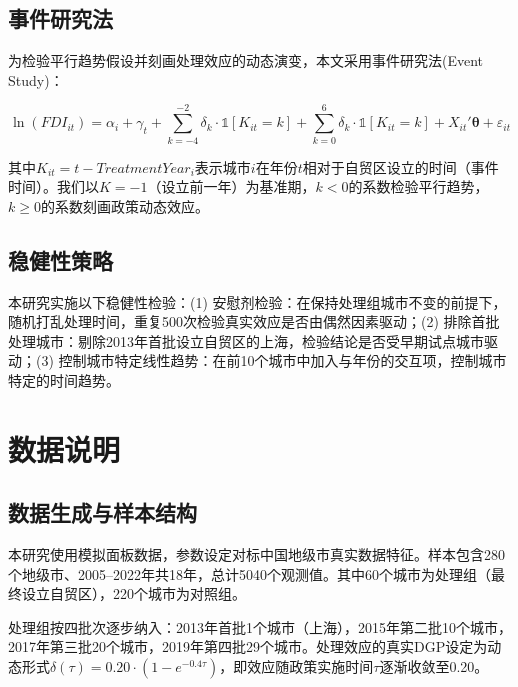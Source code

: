\documentclass[12pt,a4paper]{article}
\begin{document}
\subsection{事件研究法}

为检验平行趋势假设并刻画处理效应的动态演变，本文采用事件研究法(Event Study)：

\begin{equation}
\ln(FDI_{it}) = \alpha_i + \gamma_t + \sum_{k=-4}^{-2} \delta_k \cdot \mathbb{1}[K_{it}=k] + \sum_{k=0}^{6} \delta_k \cdot \mathbb{1}[K_{it}=k] + X_{it}'\boldsymbol{\theta} + \varepsilon_{it}
\label{eq:event}
\end{equation}

其中$K_{it} = t - TreatmentYear_i$表示城市$i$在年份$t$相对于自贸区设立的时间（事件时间）。我们以$K=-1$（设立前一年）为基准期，$k<0$的系数检验平行趋势，$k\ge0$的系数刻画政策动态效应。

\subsection{稳健性策略}

本研究实施以下稳健性检验：(1) 安慰剂检验：在保持处理组城市不变的前提下，随机打乱处理时间，重复500次检验真实效应是否由偶然因素驱动；(2) 排除首批处理城市：剔除2013年首批设立自贸区的上海，检验结论是否受早期试点城市驱动；(3) 控制城市特定线性趋势：在前10个城市中加入与年份的交互项，控制城市特定的时间趋势。


\section{数据说明}
\label{sec:data}

\subsection{数据生成与样本结构}

本研究使用模拟面板数据，参数设定对标中国地级市真实数据特征。样本包含280个地级市、2005--2022年共18年，总计5040个观测值。其中60个城市为处理组（最终设立自贸区），220个城市为对照组。

处理组按四批次逐步纳入：2013年首批1个城市（上海），2015年第二批10个城市，2017年第三批20个城市，2019年第四批29个城市。处理效应的真实DGP设定为动态形式$\delta(\tau)=0.20\cdot(1-e^{-0.4\tau})$，即效应随政策实施时间$\tau$逐渐收敛至0.20。
\end{document}
